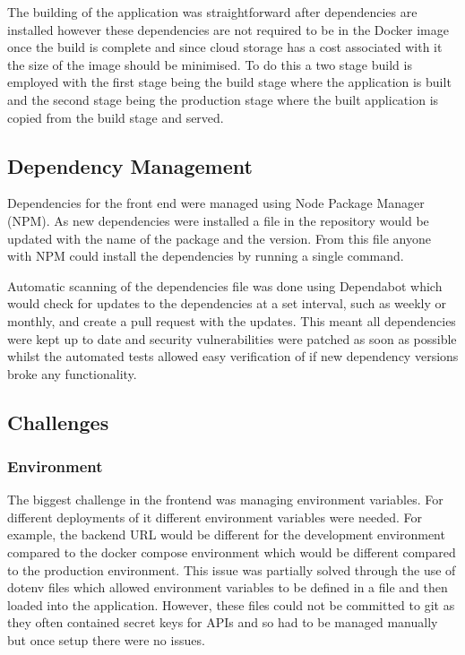 The building of the application was straightforward after dependencies are installed however these dependencies are not required to be in the Docker image once the build is complete and since cloud storage has a cost associated with it the size of the image should be minimised. To do this a two stage build is employed with the first stage being the build stage where the application is built and the second stage being the production stage where the built application is copied from the build stage and served.

\subsection{Dependency Management}
Dependencies for the front end were managed using Node Package Manager (NPM). As new dependencies were installed a file in the repository would be updated with the name of the package and the version. From this file anyone with NPM could install the dependencies by running a single command.

Automatic scanning of the dependencies file was done using Dependabot which would check for updates to the dependencies at a set interval, such as weekly or monthly, and create a pull request with the updates. This meant all dependencies were kept up to date and security vulnerabilities were patched as soon as possible whilst the automated tests allowed easy verification of if new dependency versions broke any functionality.

\subsection{Challenges}
\subsubsection{Environment}
The biggest challenge in the frontend was managing environment variables. For different deployments of it different environment variables were needed. For example, the backend URL would be different for the development environment compared to the docker compose environment which would be different compared to the production environment. This issue was partially solved through the use of dotenv files which allowed environment variables to be defined in a file and then loaded into the application. However, these files could not be committed to git as they often contained secret keys for APIs and so had to be managed manually but once setup there were no issues.

